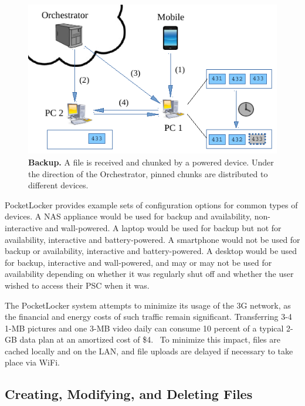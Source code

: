 \begin{figure}[t]

\includegraphics{./figures/backup.pdf}

\caption{\small \textbf{Backup.} A file is received and chunked by a powered
device.  Under the direction of the Orchestrator, pinned chunks are
distributed to different devices.}

\label{fig-design-backup}

\vspace*{-0.2in}
\end{figure}
PocketLocker provides example sets of configuration options for common types of
devices. A NAS appliance would be used for backup and availability,
non-interactive and wall-powered. A laptop would be used for backup but not for
availability, interactive and battery-powered. A smartphone would not be used
for backup or availability, interactive and battery-powered. A desktop would be
used for backup, interactive and wall-powered, and may or may not be used for
availability depending on whether it was regularly shut off and whether the
user wished to access their PSC when it was.

The PocketLocker system attempts to minimize its usage of the 3G network, as
the financial and energy costs of such traffic remain significant.  Transferring
3-4 1-MB pictures and one 3-MB video daily can consume 10 percent of a typical
2-GB data plan at an amortized cost of \$4.~\cite{att-prices,verizon-prices}
To minimize this impact, files are cached locally and on the LAN, and file
uploads are delayed if necessary to take place via WiFi.

\subsection{Creating, Modifying, and Deleting Files}

